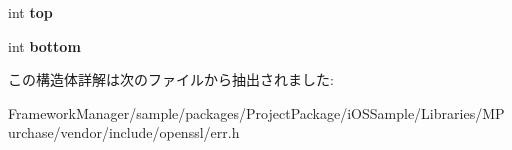 \begin{DoxyCompactItemize}
\item 
\hypertarget{structerr__state__st_a02b49831a2d90a87b14ae7ad28f0bfb7}{}int {\bfseries top}\label{structerr__state__st_a02b49831a2d90a87b14ae7ad28f0bfb7}

\item 
\hypertarget{structerr__state__st_a91a24fe0ee64f2618dac094713874c01}{}int {\bfseries bottom}\label{structerr__state__st_a91a24fe0ee64f2618dac094713874c01}

\end{DoxyCompactItemize}


この構造体詳解は次のファイルから抽出されました\+:\begin{DoxyCompactItemize}
\item 
Framework\+Manager/sample/packages/\+Project\+Package/i\+O\+S\+Sample/\+Libraries/\+M\+Purchase/vendor/include/openssl/err.\+h\end{DoxyCompactItemize}
